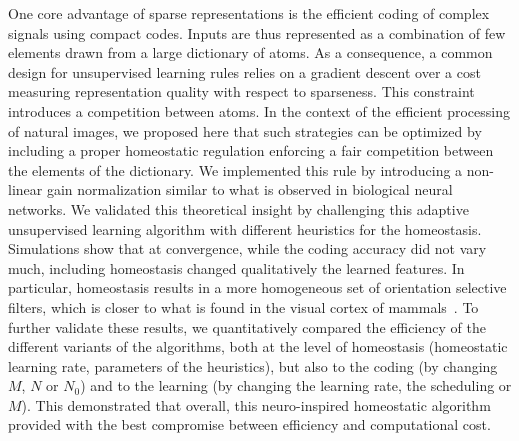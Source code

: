 \documentclass[vision,article,submit,oneauthor,pdftex]{Definitions/mdpi}
\begin{document}
One core advantage of sparse representations is the efficient coding of complex signals using compact codes. Inputs are thus represented as a combination of few elements drawn from a large dictionary of atoms. As a consequence, a common design for unsupervised learning rules relies on a gradient descent over a cost measuring representation quality with respect to sparseness. This constraint introduces a competition between atoms. In the context of the efficient processing of natural images, we proposed here that such strategies can be optimized by including a proper homeostatic regulation enforcing a fair competition between the elements of the dictionary. We implemented this rule by introducing a non-linear gain normalization similar to what is observed in biological neural networks. We validated this theoretical insight by challenging this adaptive unsupervised learning algorithm with different heuristics for the homeostasis. Simulations show that at convergence, while the coding accuracy did not vary much, including homeostasis changed qualitatively the learned features. In particular, homeostasis results in a more homogeneous set of orientation selective filters, which is closer to what is found in the visual cortex of mammals~\citep{Ringach02,Rehn07,Loxley17}. To further validate these results, we quantitatively compared the efficiency of the different variants of the algorithms, both at the level of homeostasis (homeostatic learning rate, parameters of the heuristics), but also to the coding (by changing $M$, $N$ or $N_0$) and to the learning (by changing the learning rate, the scheduling or $M$). This demonstrated that overall, this neuro-inspired homeostatic algorithm provided with the best compromise between efficiency and computational cost. 
\end{document}
